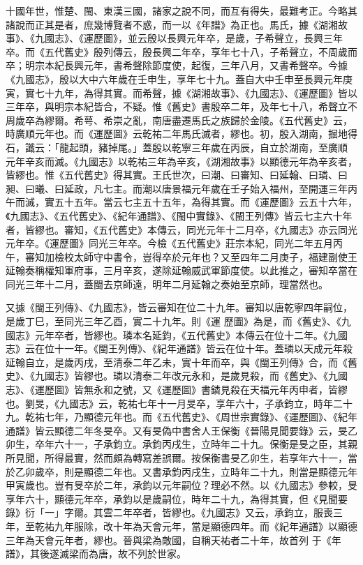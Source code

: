 \begin{pinyinscope}
 十國年世，惟楚、閩、東漢三國，諸家之說不同，而互有得失，最難考正。今略其諸說而正其是者，庶幾博覽者不惑，而一以《年譜》為正也。馬氏，據《湖湘故事》、《九國志》、《運歷圖》，並云殷以長興元年卒，是歲，子希聲立，長興三年卒。而《五代舊史》殷列傳云，殷長興二年卒，享年七十八，子希聲立，不周歲而卒；明宗本紀長興元年，書希聲除節度使，起復，三年八月，又書希聲卒。今據《九國志》，殷以大中六年歲在壬申生，享年七十九。蓋自大中壬申至長興元年庚寅，實七十九年，為得其實。而希聲，據《湖湘故事》、《九國志》、《運歷圖》皆以三年卒，與明宗本紀皆合，不疑。惟《舊史》書殷卒二年，及年七十八，希聲立不周歲卒為繆爾。希萼、希崇之亂，南唐盡遷馬氏之族歸於金陵。《五代舊史》云，時廣順元年也。而《運歷圖》云乾祐二年馬氏滅者，繆也。初，殷入湖南，掘地得石，讖云：「龍起頭，豬掉尾。」蓋殷以乾寧三年歲在丙辰，自立於湖南，至廣順
 元年辛亥而滅。《九國志》以乾祐三年為辛亥，《湖湘故事》以顯德元年為辛亥者，皆繆也。惟《五代舊史》得其實。王氏世次，曰潮、曰審知、曰延翰、曰璘、曰昶、曰曦、曰延政，凡七主。而潮以唐景福元年歲在壬子始入福州，至開運三年丙午而滅，實五十五年。當云七主五十五年，為得其實。而《運歷圖》云五十六年，《九國志》、《五代舊史》、《紀年通譜》、《閩中實錄》、《閩王列傳》皆云七主六十年者，皆繆也。審知，《五代舊史》本傳云，同光元年十二月卒，《九國志》亦云同光元年卒。《運歷圖》同光三年卒。今檢《五代舊史》莊宗本紀，同光二年五月丙午，審知加檢校太師守中書令，豈得卒於元年也？又至四年二月庚子，福建副使王延翰奏稱權知軍府事，三月辛亥，遂除延翰威武軍節度使。以此推之，審知卒當在同光三年十二月，蓋閩去京師遠，明年二月延翰之奏始至京師，理當然也。



 又據《閩王列傳》、《九國志》，皆云審知在位二十九年。審知以唐乾寧四年嗣位，是歲丁巳，至同光三年乙酉，實二十九年。則《運
 歷圖》為是，而《舊史》、《九國志》元年卒者，皆繆也。璘本名延鈞，《五代舊史》本傳云在位十二年。《九國志》云在位十一年。《閩王列傳》、《紀年通譜》皆云在位十年。蓋璘以天成元年殺延翰自立，是歲丙戌，至清泰二年乙未，實十年而卒，與《閩王列傳》合，而《舊史》、《九國志》皆繆也。璘以清泰二年改元永和，是歲見殺，而《舊史》、《九國志》、《運歷圖》皆無永和之號，又《運歷圖》書鏻見殺在天福元年丙申者，皆繆也。劉旻，《九國志》云，乾祐七年十一月旻卒，享年六十，子承鈞立，時年二十九。乾祐七年，乃顯德元年也。而《五代舊史》、《周世宗實錄》、《運歷圖》、《紀年通譜》皆云顯德二年冬旻卒。又有旻偽中書舍人王保衡《晉陽見聞要錄》云，旻乙卯生，卒年六十一，子承鈞立。承鈞丙戌生，立時年二十九。保衡是旻之臣，其親所見聞，所得最實，然而頗為轉寫差誤爾。按保衡書旻乙卯生，若享年六十一，當於乙卯歲卒，則是顯德二年也。又書承鈞丙戌生，立時年二十九，則當是顯德元年甲寅歲也。豈有旻卒於二年，承鈞以元年嗣位？理必不然。以《九國志》參較，旻
 享年六十，顯德元年卒，承鈞以是歲嗣位，時年二十九，為得其實，但《見聞要錄》衍「一」字爾。其雲二年卒者，皆繆也。《九國志》又云，承鈞立，服喪三年，至乾祐九年服除，改十年為天會元年，當是顯德四年。而《紀年通譜》以顯德三年為天會元年者，繆也。晉與梁為敵國，自稱天祐者二十年，故首列
 于《年譜》，其後遂滅梁而為唐，故不列於世家。



\end{pinyinscope}